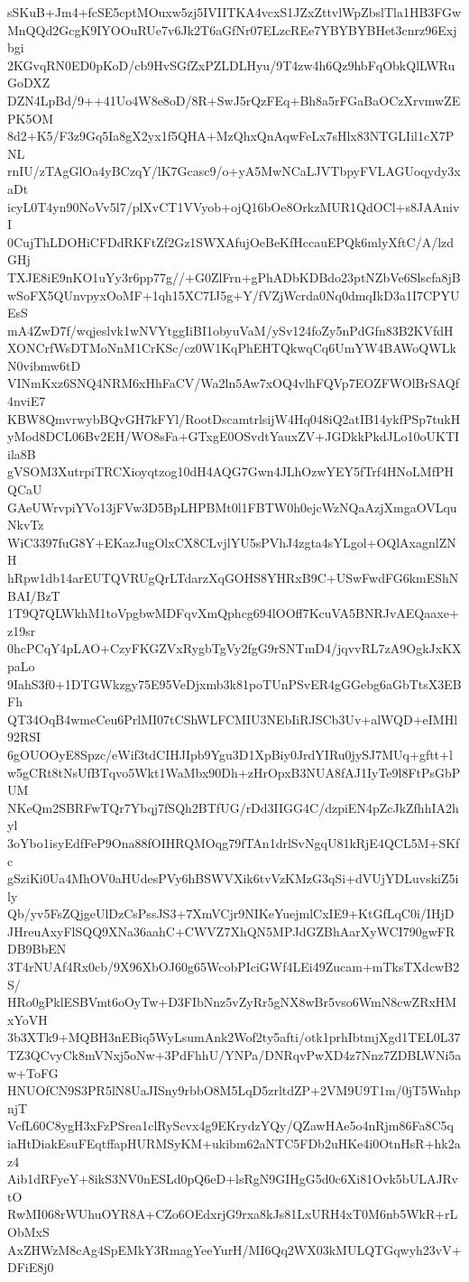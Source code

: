 sSKuB+Jm4+fcSE5cptMOuxw5zj5IVIITKA4vcxS1JZxZttvlWpZbslTla1HB3FGw
MnQQd2GcgK9IYOOuRUe7v6Jk2T6aGfNr07ELzcREe7YBYBYBHet3cnrz96Exjbgi
2KGvqRN0ED0pKoD/cb9HvSGfZxPZLDLHyu/9T4zw4h6Qz9hbFqObkQlLWRuGoDXZ
DZN4LpBd/9++41Uo4W8e8oD/8R+SwJ5rQzFEq+Bh8a5rFGaBaOCzXrvmwZEPK5OM
8d2+K5/F3z9Gq5Ia8gX2yx1f5QHA+MzQhxQnAqwFeLx7sHlx83NTGLIil1cX7PNL
rnIU/zTAgGlOa4yBCzqY/lK7Gcasc9/o+yA5MwNCaLJVTbpyFVLAGUoqydy3xaDt
icyL0T4yn90NoVv5l7/plXvCT1VVyob+ojQ16bOe8OrkzMUR1QdOCl+s8JAAnivI
0CujThLDOHiCFDdRKFtZf2Gz1SWXAfujOeBeKfHccauEPQk6mlyXftC/A/lzdGHj
TXJE8iE9nKO1uYy3r6pp77g//+G0ZlFrn+gPhADbKDBdo23ptNZbVe6Slscfa8jB
wSoFX5QUnvpyxOoMF+1qh15XC7IJ5g+Y/fVZjWcrda0Nq0dmqIkD3a1I7CPYUEsS
mA4ZwD7f/wqjeslvk1wNVYtggIiBI1obyuVaM/ySv124foZy5nPdGfn83B2KVfdH
XONCrfWsDTMoNnM1CrKSc/cz0W1KqPhEHTQkwqCq6UmYW4BAWoQWLkN0vibmw6tD
VINmKxz6SNQ4NRM6xHhFaCV/Wa2ln5Aw7xOQ4vlhFQVp7EOZFWOlBrSAQf4nviE7
KBW8QmvrwybBQvGH7kFYl/RootDscamtrlsijW4Hq048iQ2atIB14ykfPSp7tukH
yMod8DCL06Bv2EH/WO8sFa+GTxgE0OSvdtYauxZV+JGDkkPkdJLo10oUKTIila8B
gVSOM3XutrpiTRCXioyqtzog10dH4AQG7Gwn4JLhOzwYEY5fTrf4HNoLMfPHQCaU
GAeUWrvpiYVo13jFVw3D5BpLHPBMt0l1FBTW0h0ejcWzNQaAzjXmgaOVLquNkvTz
WiC3397fuG8Y+EKazJugOlxCX8CLvjlYU5sPVhJ4zgta4sYLgol+OQlAxagnlZNH
hRpw1db14arEUTQVRUgQrLTdarzXqGOHS8YHRxB9C+USwFwdFG6kmEShNBAI/BzT
1T9Q7QLWkhM1toVpgbwMDFqvXmQphcg694lOOff7KcuVA5BNRJvAEQaaxe+z19sr
0hcPCqY4pLAO+CzyFKGZVxRygbTgVy2fgG9rSNTmD4/jqvvRL7zA9OgkJxKXpaLo
9IahS3f0+1DTGWkzgy75E95VeDjxmb3k81poTUnPSvER4gGGebg6aGbTtsX3EBFh
QT34OqB4wmeCeu6PrlMI07tCShWLFCMIU3NEbIiRJSCb3Uv+alWQD+eIMHl92RSI
6gOUOOyE8Spzc/eWif3tdCIHJIpb9Ygu3D1XpBiy0JrdYIRu0jySJ7MUq+gftt+l
w5gCRt8tNsUfBTqvo5Wkt1WaMbx90Dh+zHrOpxB3NUA8fAJ1IyTe9l8FtPsGbPUM
NKeQm2SBRFwTQr7Ybqj7fSQh2BTfUG/rDd3IIGG4C/dzpiEN4pZcJkZfhhIA2hyl
3oYbo1isyEdfFeP9Ona88fOIHRQMOqg79fTAn1drlSvNgqU81kRjE4QCL5M+SKfc
gSziKi0Ua4MhOV0aHUdesPVy6hBSWVXik6tvVzKMzG3qSi+dVUjYDLuvskiZ5ily
Qb/yv5FsZQjgeUlDzCsPssJS3+7XmVCjr9NIKeYuejmlCxIE9+KtGfLqC0i/IHjD
JHreuAxyFlSQQ9XNa36aahC+CWVZ7XhQN5MPJdGZBhAarXyWCI790gwFRDB9BbEN
3T4rNUAf4Rx0cb/9X96XbOJ60g65WcobPIciGWf4LEi49Zucam+mTksTXdcwB2S/
HRo0gPklESBVmt6oOyTw+D3FIbNnz5vZyRr5gNX8wBr5vso6WmN8cwZRxHMxYoVH
3b3XTk9+MQBH3nEBiq5WyLsumAnk2Wof2ty5afti/otk1prhIbtmjXgd1TEL0L37
TZ3QCvyCk8mVNxj5oNw+3PdFhhU/YNPa/DNRqvPwXD4z7Nnz7ZDBLWNi5aw+ToFG
HNUOfCN9S3PR5lN8UaJISny9rbbO8M5LqD5zrltdZP+2VM9U9T1m/0jT5WnhpnjT
VcfL60C8ygH3xFzPSrea1clRyScvx4g9EKrydzYQy/QZawHAe5o4nRjm86Fa8C5q
iaHtDiakEsuFEqtffapHURMSyKM+ukibm62aNTC5FDb2uHKe4i0OtnHsR+hk2az4
Aib1dRFyeY+8ikS3NV0nESLd0pQ6eD+lsRgN9GIHgG5d0c6Xi81Ovk5bULAJRvtO
RwMI068rWUhuOYR8A+CZo6OEdxrjG9rxa8kJs81LxURH4xT0M6nb5WkR+rLObMxS
AxZHWzM8cAg4SpEMkY3RmagYeeYurH/MI6Qq2WX03kMULQTGqwyh23vV+DFiE8j0
